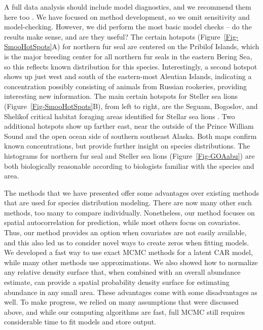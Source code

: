 \documentclass[11pt, titlepage]{article}
\begin{document}
\begin{spacing}{1.9}
\begin{flushleft}
A full data analysis should include model diagnostics, and we recommend them here too \citep{conn_guide_2018}.  We have focused on method development, so we omit sensitivity and model-checking.  However, we did perform the most basic model checks -- do the results make sense, and are they useful?  The certain hotspots (Figure~\ref{Fig-SmooHotSpots}A) for northern fur seal are centered on the Pribilof Islands, which is the major breeding center for all northern fur seals in the eastern Bering Sea, so this reflects known distribution for this species.  Interestingly, a second hotspot shows up just west and south of the eastern-most Aleutian Islands, indicating a concentration possibly consisting of animals from Russian rookeries, providing interesting new information. The main certain hotspots for Steller sea lions (Figure~\ref{Fig-SmooHotSpots}B), from left to right, are the Seguam, Bogoslov, and Shelikof critical habitat foraging areas identified for Stellar sea lions \citep{HimesBoorEtAl2012Stellersealion}.  Two additional hotspots show up farther east, near the outside of the Prince William Sound and the open ocean side of southern southeast Alaska.  Both maps confirm known concentrations, but provide further insight on species distributions.  The histograms for northern fur seal and Steller sea lions (Figure~\ref{Fig-GOAabu}) are both biologically reasonable according to biologists familiar with the species and area.

The methods that we have presented offer some advantages over existing methods that are used for species distribution modeling.  There are now many other such methods, too many to compare individually.  Nonetheless, our method focuses on spatial autocorrelation for prediction, while most others focus on covariates. Thus, our method provides an option when covariates are not easily available, and this also led us to consider novel ways to create zeros when fitting models.  We developed a fast way to use exact MCMC methods for a latent CAR model, while many other methods use approximations.  We also showed how to normalize any relative density surface that, when combined with an overall abundance estimate, can provide a spatial probability density surface for estimating abundance in any small area.  These advantages come with some disadvantages as well.  To make progress, we relied on many assumptions that were discussed above, and while our computing algorithms are fast, full MCMC still requires considerable time to fit models and store output.


\end{flushleft}
\end{spacing}
\end{document}
